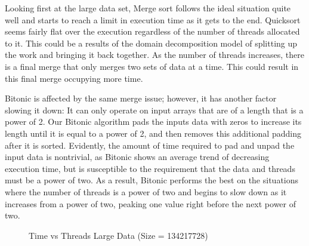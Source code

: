 \documentclass[journal]{IEEEtran}
\begin{document}
Looking first at the large data set, Merge sort follows the ideal situation quite well and starts to reach a limit in execution time as it gets to the end. Quicksort seems fairly flat over the execution regardless of the number of threads allocated to it. This could be a results of the domain decomposition model of splitting up the work and bringing it back together. As the number of threads increases, there is a final merge that only merges two sets of data at a time. This could result in this final merge occupying more time. 

Bitonic is affected by the same merge issue; however, it has another factor slowing it down:  It can only operate on input arrays that are of a length that is a power of 2.  Our Bitonic algorithm pads the inputs data with zeros to increase its length until it is equal to a power of 2, and then removes this additional padding after it is sorted.  Evidently, the amount of time required to pad and unpad the input data is nontrivial, as Bitonic shows an average trend of decreasing execution time, but is susceptible to the requirement that the data and threads must be a power of two. As a result, Bitonic performs the best on the situations where the number of threads is a power of two and begins to slow down as it increases from a power of two, peaking one value right before the next power of two.  

\begin{figure}[t]
  \centering
  \caption{Time vs Threads Large Data (Size = 134217728)}
  \label{fig:tvtlg}
\end{figure}
\end{document}
